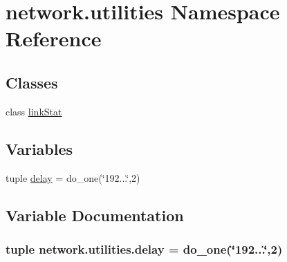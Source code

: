 \hypertarget{namespacenetwork_1_1utilities}{}\section{network.\+utilities Namespace Reference}
\label{namespacenetwork_1_1utilities}
\subsection*{Classes}
\begin{DoxyCompactItemize}
\item 
class \hyperlink{classnetwork_1_1utilities_1_1linkStat}{link\+Stat}
\end{DoxyCompactItemize}
\subsection*{Variables}
\begin{DoxyCompactItemize}
\item 
tuple \hyperlink{namespacenetwork_1_1utilities_a9096e0dec9dd0ce60a1934b8b4ac06cf}{delay} = do\+\_\+one(\char`\"{}192...\char`\"{},2)
\end{DoxyCompactItemize}


\subsection{Variable Documentation}
\hypertarget{namespacenetwork_1_1utilities_a9096e0dec9dd0ce60a1934b8b4ac06cf}{}
\subsubsection[{delay}]{\setlength{\rightskip}{0pt plus 5cm}tuple network.\+utilities.\+delay = do\+\_\+one(\char`\"{}192...\char`\"{},2)}\label{namespacenetwork_1_1utilities_a9096e0dec9dd0ce60a1934b8b4ac06cf}
